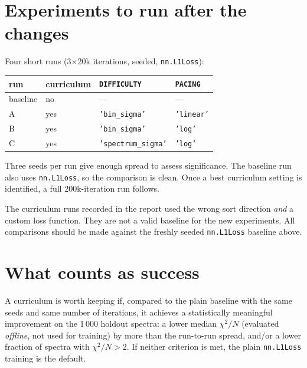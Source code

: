 \documentclass[11pt]{article}
\newcommand{\code}[1]{\texttt{#1}}
\begin{document}
\section{Experiments to run after the changes}

Four short runs (3$\times$20k iterations, seeded, \code{nn.L1Loss}):

\begin{center}
\small
\begin{tabular}{llll}
\toprule
run & curriculum & \code{DIFFICULTY} & \code{PACING} \\
\midrule
baseline & no & --- & --- \\
A & yes & \code{'bin\_sigma'} & \code{'linear'} \\
B & yes & \code{'bin\_sigma'} & \code{'log'} \\
C & yes & \code{'spectrum\_sigma'} & \code{'log'} \\
\bottomrule
\end{tabular}
\end{center}

Three seeds per run give enough spread to assess significance. The baseline
run also uses \code{nn.L1Loss}, so the comparison is clean. Once a best
curriculum setting is identified, a full 200k-iteration run follows.

\begin{watch}
The curriculum runs recorded in the report used the wrong sort direction
\emph{and} a custom loss function. They are not a valid baseline for the new
experiments. All comparisons should be made against the freshly seeded
\code{nn.L1Loss} baseline above.
\end{watch}

\section{What counts as success}

A curriculum is worth keeping if, compared to the plain baseline with the same
seeds and same number of iterations, it achieves a statistically meaningful
improvement on the 1\,000 holdout spectra: a lower median $\chi^2/N$
(evaluated \emph{offline}, not used for training) by more than the
run-to-run spread, and/or a lower fraction of spectra with $\chi^2/N > 2$.
If neither criterion is met, the plain \code{nn.L1Loss} training is the
default.
\end{document}
